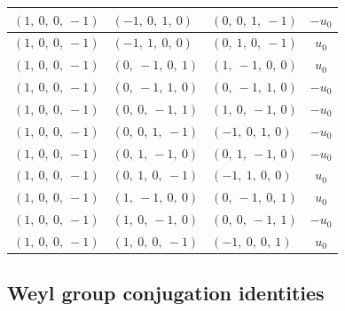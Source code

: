 \documentclass[11pt]{article}
\theoremstyle{definition}
\begin{document}
\begin{longtable}{|l|l|l|c|}
    \hline
    $\left( 1, \  0, \  0, \  -1\right)$ & $\left( -1, \  0, \  1, \  0\right)$ & $\left( 0, \  0, \  1, \  -1\right)$ & $- u_{0}$ \\
    \hline
    $\left( 1, \  0, \  0, \  -1\right)$ & $\left( -1, \  1, \  0, \  0\right)$ & $\left( 0, \  1, \  0, \  -1\right)$ & $u_{0}$ \\
    \hline
    $\left( 1, \  0, \  0, \  -1\right)$ & $\left( 0, \  -1, \  0, \  1\right)$ & $\left( 1, \  -1, \  0, \  0\right)$ & $u_{0}$ \\
    \hline
    $\left( 1, \  0, \  0, \  -1\right)$ & $\left( 0, \  -1, \  1, \  0\right)$ & $\left( 0, \  -1, \  1, \  0\right)$ & $- u_{0}$ \\
    \hline
    $\left( 1, \  0, \  0, \  -1\right)$ & $\left( 0, \  0, \  -1, \  1\right)$ & $\left( 1, \  0, \  -1, \  0\right)$ & $- u_{0}$ \\
    \hline
    $\left( 1, \  0, \  0, \  -1\right)$ & $\left( 0, \  0, \  1, \  -1\right)$ & $\left( -1, \  0, \  1, \  0\right)$ & $- u_{0}$ \\
    \hline
    $\left( 1, \  0, \  0, \  -1\right)$ & $\left( 0, \  1, \  -1, \  0\right)$ & $\left( 0, \  1, \  -1, \  0\right)$ & $- u_{0}$ \\
    \hline
    $\left( 1, \  0, \  0, \  -1\right)$ & $\left( 0, \  1, \  0, \  -1\right)$ & $\left( -1, \  1, \  0, \  0\right)$ & $u_{0}$ \\
    \hline
    $\left( 1, \  0, \  0, \  -1\right)$ & $\left( 1, \  -1, \  0, \  0\right)$ & $\left( 0, \  -1, \  0, \  1\right)$ & $u_{0}$ \\
    \hline
    $\left( 1, \  0, \  0, \  -1\right)$ & $\left( 1, \  0, \  -1, \  0\right)$ & $\left( 0, \  0, \  -1, \  1\right)$ & $- u_{0}$ \\
    \hline
    $\left( 1, \  0, \  0, \  -1\right)$ & $\left( 1, \  0, \  0, \  -1\right)$ & $\left( -1, \  0, \  0, \  1\right)$ & $u_{0}$ \\
    \hline
\end{longtable}


\subsection{Weyl group conjugation identities}
\end{document}
